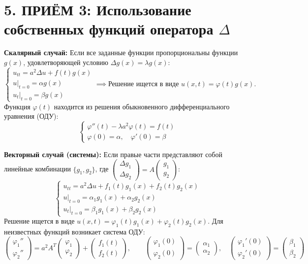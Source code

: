 \documentclass[a4paper,10pt]{article}
\begin{document}
\section{5. ПРИЁМ 3: Использование собственных функций оператора $\Delta$}
\textbf{Скалярный случай:} Если все заданные функции пропорциональны функции $g(x)$, удовлетворяющей условию $\Delta g(x) = \lambda g(x)$: 
\[
\begin{cases} 
u_{tt} = a^2 \Delta u + f(t)g(x) \\ 
u|_{t=0} = \alpha g(x) \\ 
u_t|_{t=0} = \beta g(x) 
\end{cases} 
\implies \text{Решение ищется в виде } u(x,t) = \varphi(t)g(x).
\]
Функция $\varphi(t)$ находится из решения обыкновенного дифференциального уравнения (ОДУ):
\[
\begin{cases} 
\varphi''(t) - \lambda a^2 \varphi(t) = f(t) \\ 
\varphi(0) = \alpha, \quad \varphi'(0) = \beta 
\end{cases}
\]

\noindent\textbf{Векторный случай (системы):} Если правые части представляют собой линейные комбинации $\{g_1, g_2\}$, где $\begin{pmatrix} \Delta g_1 \\ \Delta g_2 \end{pmatrix} = A \begin{pmatrix} g_1 \\ g_2 \end{pmatrix}$:
\[
\begin{cases}
u_{tt} = a^2 \Delta u + f_1(t)g_1(x) + f_2(t)g_2(x) \\
u|_{t=0} = \alpha_1 g_1(x) + \alpha_2 g_2(x) \\
u_t|_{t=0} = \beta_1 g_1(x) + \beta_2 g_2(x)
\end{cases}
\]
Решение ищется в виде $u(x,t) = \varphi_1(t)g_1(x) + \varphi_2(t)g_2(x)$. Для неизвестных функций возникает система ОДУ: 
\[
\begin{pmatrix} \varphi_1'' \\ \varphi_2'' \end{pmatrix} = 
a^2 A^T \begin{pmatrix} \varphi_1 \\ \varphi_2 \end{pmatrix} + \begin{pmatrix} f_1(t) \\ f_2(t) \end{pmatrix}, \qquad
\begin{pmatrix} \varphi_1(0) \\ \varphi_2(0) \end{pmatrix} = \begin{pmatrix} \alpha_1 \\ \alpha_2 \end{pmatrix}, \quad
\begin{pmatrix} \varphi_1'(0) \\ \varphi_2'(0) \end{pmatrix} = \begin{pmatrix} \beta_1 \\ \beta_2 \end{pmatrix}
\]
\end{document}
